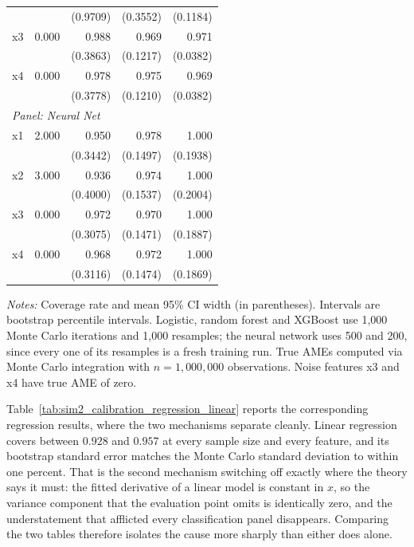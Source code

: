 \documentclass[12pt]{article}
\begin{document}
\begin{table}[htbp]
\begin{threeparttable}
\begin{tabular}{lrrrr}
				&  & (0.9709) & (0.3552) & (0.1184) \\
				\quad x3 & 0.000 & 0.988 & 0.969 & 0.971 \\
				&  & (0.3863) & (0.1217) & (0.0382) \\
				\quad x4 & 0.000 & 0.978 & 0.975 & 0.969 \\
				&  & (0.3778) & (0.1210) & (0.0382) \\
				\midrule
				\multicolumn{5}{l}{\textit{Panel: Neural Net}} \\
				\quad x1 & 2.000 & 0.950 & 0.978 & 1.000 \\
				&  & (0.3442) & (0.1497) & (0.1938) \\
				\quad x2 & 3.000 & 0.936 & 0.974 & 1.000 \\
				&  & (0.4000) & (0.1537) & (0.2004) \\
				\quad x3 & 0.000 & 0.972 & 0.970 & 1.000 \\
				&  & (0.3075) & (0.1471) & (0.1887) \\
				\quad x4 & 0.000 & 0.968 & 0.972 & 1.000 \\
				&  & (0.3116) & (0.1474) & (0.1869) \\
				\bottomrule
				\end{tabular}
				\begin{tablenotes}
				\footnotesize
				\item \textit{Notes:} Coverage rate and mean 95\% CI width (in parentheses). Intervals are bootstrap percentile intervals. Logistic, random forest and XGBoost use 1{,}000 Monte Carlo iterations and 1{,}000 resamples; the neural network uses 500 and 200, since every one of its resamples is a fresh training run. True AMEs computed via Monte Carlo integration with $n=1{,}000{,}000$ observations. Noise features x3 and x4 have true AME of zero.
				\end{tablenotes}
		\end{threeparttable}
	\end{table}
	
	Table~\ref{tab:sim2_calibration_regression_linear} reports the corresponding regression results, where the two mechanisms separate cleanly. Linear regression covers between $0.928$ and $0.957$ at every sample size and every feature, and its bootstrap standard error matches the Monte Carlo standard deviation to within one percent. That is the second mechanism switching off exactly where the theory says it must: the fitted derivative of a linear model is constant in $x$, so the variance component that the evaluation point omits is identically zero, and the understatement that afflicted every classification panel disappears. Comparing the two tables therefore isolates the cause more sharply than either does alone.
	
\end{document}
